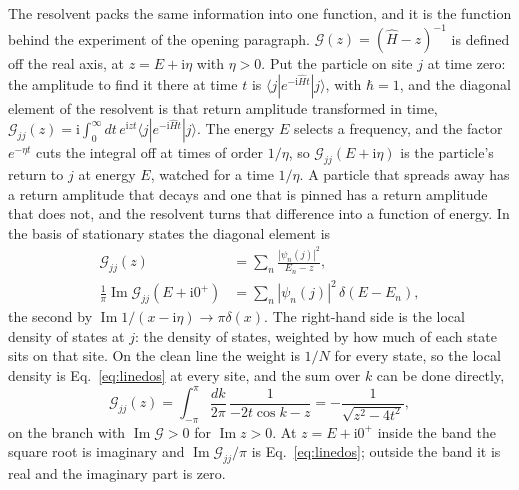 The resolvent packs the same information into one function, and it is
the function behind the experiment of the opening paragraph.
$\mathcal{G}(z)=(\hat H-z)^{-1}$ is defined off the real axis, at
$z=E+\mathrm{i}\eta$ with $\eta>0$. Put the particle on site $j$ at time
zero: the amplitude to find it there at time $t$ is
$\langle j|e^{-\mathrm{i}\hat Ht}|j\rangle$, with $\hbar=1$, and the
diagonal element of the resolvent is that return amplitude transformed
in time,
$\mathcal{G}_{jj}(z)=\mathrm{i}\int_{0}^{\infty}dt\,e^{\mathrm{i}zt}
\langle j|e^{-\mathrm{i}\hat Ht}|j\rangle$. The energy $E$ selects a
frequency, and the factor $e^{-\eta t}$ cuts the integral off at times
of order $1/\eta$, so $\mathcal{G}_{jj}(E+\mathrm{i}\eta)$ is the
particle's return to $j$ at energy $E$, watched for a time $1/\eta$. A
particle that spreads away has a return amplitude that decays and one
that is pinned has a return amplitude that does not, and the resolvent
turns that difference into a function of energy. In the basis of
stationary states the diagonal element is
\begin{equation}
  \begin{split}
  \mathcal{G}_{jj}(z)&=\sum_{n}\frac{|\psi_{n}(j)|^{2}}{E_{n}-z},\\
  \frac{1}{\pi}\operatorname{Im}\mathcal{G}_{jj}(E+\mathrm{i}0^{+})
  &=\sum_{n}|\psi_{n}(j)|^{2}\,\delta(E-E_{n}),
  \end{split}
  \label{eq:ldos}
\end{equation}
the second by $\operatorname{Im}1/(x-\mathrm{i}\eta)\to\pi\delta(x)$. The
right-hand side is the local density of states at $j$: the density of
states, weighted by how much of each state sits on that site. On the
clean line the weight is $1/N$ for every state, so the local density is
Eq.~\eqref{eq:linedos} at every site, and the sum over $k$ can be done
directly,
\begin{equation}
  \mathcal{G}_{jj}(z)=\int_{-\pi}^{\pi}\frac{dk}{2\pi}\,
  \frac{1}{-2t\cos k-z}
  =-\frac{1}{\sqrt{z^{2}-4t^{2}}},
  \label{eq:lineG}
\end{equation}
on the branch with $\operatorname{Im}\mathcal{G}>0$ for
$\operatorname{Im}z>0$. At $z=E+\mathrm{i}0^{+}$ inside the band the square
root is imaginary and $\operatorname{Im}\mathcal{G}_{jj}/\pi$ is
Eq.~\eqref{eq:linedos}; outside the band it is real and the imaginary
part is zero.

